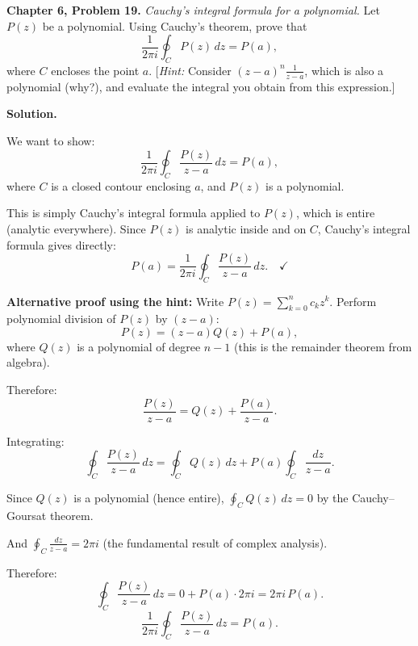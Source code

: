 \documentclass[12pt]{article}
\begin{document}
\textbf{Chapter 6, Problem 19.} \textit{Cauchy's integral formula for a polynomial.} Let $P(z)$ be a polynomial. Using Cauchy's theorem, prove that
\[
\frac{1}{2\pi i}\oint_C P(z)\,dz = P(a),
\]
where $C$ encloses the point $a$. [\textit{Hint:} Consider $(z-a)^n\frac{1}{z-a}$, which is also a polynomial (why?), and evaluate the integral you obtain from this expression.]

\bigskip
\textbf{Solution.}

We want to show:
\[
\frac{1}{2\pi i}\oint_C \frac{P(z)}{z-a}\,dz = P(a),
\]
where $C$ is a closed contour enclosing $a$, and $P(z)$ is a polynomial.

This is simply Cauchy's integral formula applied to $P(z)$, which is entire (analytic everywhere). Since $P(z)$ is analytic inside and on $C$, Cauchy's integral formula gives directly:
\[
P(a) = \frac{1}{2\pi i}\oint_C \frac{P(z)}{z-a}\,dz. \quad \checkmark
\]

\textbf{Alternative proof using the hint:} Write $P(z) = \sum_{k=0}^n c_k z^k$. Perform polynomial division of $P(z)$ by $(z-a)$:
\[
P(z) = (z-a)Q(z) + P(a),
\]
where $Q(z)$ is a polynomial of degree $n-1$ (this is the remainder theorem from algebra).

Therefore:
\[
\frac{P(z)}{z-a} = Q(z) + \frac{P(a)}{z-a}.
\]

Integrating:
\[
\oint_C \frac{P(z)}{z-a}\,dz = \oint_C Q(z)\,dz + P(a)\oint_C \frac{dz}{z-a}.
\]

Since $Q(z)$ is a polynomial (hence entire), $\oint_C Q(z)\,dz = 0$ by the Cauchy--Goursat theorem.

And $\oint_C \frac{dz}{z-a} = 2\pi i$ (the fundamental result of complex analysis).

Therefore:
\[
\oint_C \frac{P(z)}{z-a}\,dz = 0 + P(a)\cdot 2\pi i = 2\pi i\,P(a).
\]
\[
\boxed{\frac{1}{2\pi i}\oint_C \frac{P(z)}{z-a}\,dz = P(a).}
\]
\end{document}
